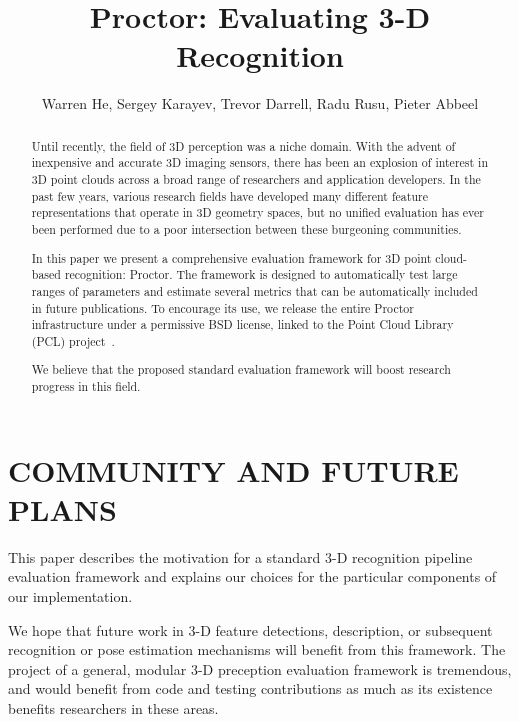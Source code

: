 \documentclass[a4paper, 10pt, conference]{ieeeconf}      %
\title{\LARGE \bf
Proctor: Evaluating 3-D Recognition
}
\author{Warren He, Sergey Karayev, Trevor Darrell, Radu Rusu, Pieter
  Abbeel}
\begin{document}
\maketitle
\thispagestyle{empty}
\pagestyle{empty}

\begin{abstract}


Until recently, the field of 3D perception was a niche domain. With the advent
of inexpensive and accurate 3D imaging sensors, there has been an explosion of
interest in 3D point clouds across a broad range of researchers and application
developers. In the past few years, various research fields have developed
many different feature representations that operate in 3D geometry spaces, but
no unified evaluation has ever been performed due to a poor intersection between
these burgeoning communities.

In this paper we present a comprehensive evaluation framework for 3D point
cloud-based recognition: Proctor.
The framework is designed to automatically test large ranges of
parameters and estimate several metrics that can be automatically included in
future publications. To encourage its use, we release the entire Proctor
infrastructure under a permissive BSD license, linked to the Point Cloud
Library (PCL) project~\cite{PCL}.


We believe that the proposed standard evaluation framework will boost
research progress in this field.

\end{abstract}







\section{COMMUNITY AND FUTURE PLANS}

This paper describes the motivation for a standard 3-D recognition pipeline
evaluation framework and explains our choices for the particular components of
our implementation.

We hope that future work in 3-D feature detections, description,
or subsequent recognition or pose estimation mechanisms will benefit
from this framework.
The project of a general, modular 3-D preception evaluation framework is
tremendous, and would benefit from code and testing contributions as much as its
existence benefits researchers in these areas.
\end{document}
